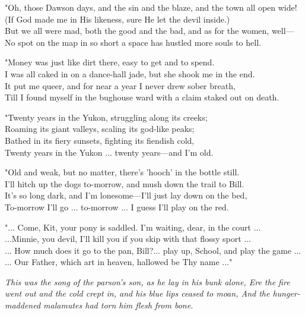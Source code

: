 \begin{poemblock}
"Oh, those Dawson days, and the sin and the blaze, and the town all open wide!\\
(If God made me in His likeness, sure He let the devil inside.)\\
But we all were mad, both the good and the bad, and as for the women, well—\\
No spot on the map in so short a space has hustled more souls to hell.

"Money was just like dirt there, easy to get and to spend.\\
I was all caked in on a dance-hall jade, but she shook me in the end.\\
It put me queer, and for near a year I never drew sober breath,\\
Till I found myself in the bughouse ward with a claim staked out on death.

"Twenty years in the Yukon, struggling along its creeks;\\
Roaming its giant valleys, scaling its god-like peaks;\\
Bathed in its fiery sunsets, fighting its fiendish cold,\\
Twenty years in the Yukon ... twenty years—and I'm old.

"Old and weak, but no matter, there's 'hooch' in the bottle still.\\
I'll hitch up the dogs to-morrow, and mush down the trail to Bill.\\
It's so long dark, and I'm lonesome—I'll just lay down on the bed,\\
To-morrow I'll go ... to-morrow ... I guess I'll play on the red.

"... Come, Kit, your pony is saddled. I'm waiting, dear, in the court ...\\
...Minnie, you devil, I'll kill you if you skip with that flossy sport ...\\
... How much does it go to the pan, Bill?... play up, School, and play the game ...\\
... Our Father, which art in heaven, hallowed be Thy name ..."

\textit{
This was the song of the parson's son, as he lay in his bunk alone,
Ere the fire went out and the cold crept in, and his blue lips ceased to moan,
And the hunger-maddened malamutes had torn him flesh from bone.
}

\end{poemblock}
